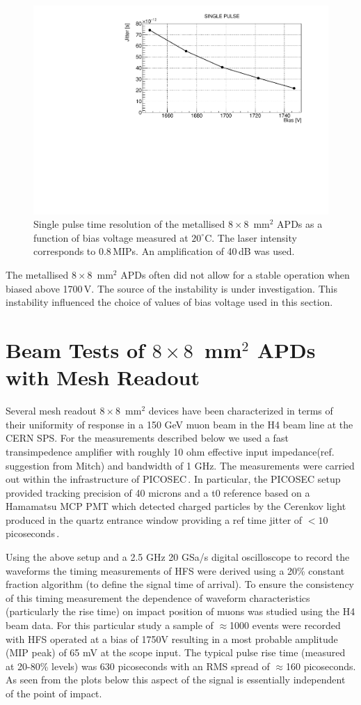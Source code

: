 \documentclass{article}
\begin{document}
\begin{figure}
  \centering
  \includegraphics[width = 0.6 \textwidth]{timeRes8x8metal}
  \caption{Single pulse time resolution of the metallised $8 \times 8$~mm$^2$ APDs as a function of bias voltage measured at $20^\circ$C. The laser intensity corresponds to 0.8\,MIPs. An amplification of 40\,dB was used.}
  \label{fig:timeRes8x8metal}
\end{figure}

The metallised $8 \times 8$~mm$^2$ APDs often did not allow for a stable operation when biased above 1700\,V.
The source of the instability is under investigation.
This instability influenced the choice of values of bias voltage used in this section.

\section{Beam Tests of $8 \times 8$~mm$^2$ APDs with Mesh Readout}
\label{sec:tb8x8}

Several mesh readout $8 \times 8$~mm$^2$ devices have been characterized in terms of their uniformity of response in a 150 GeV muon beam in the H4 beam line at the CERN SPS.
For the measurements described below we used a fast transimpedence amplifier with roughly 10 ohm effective input impedance(ref. suggestion from Mitch) and bandwidth of 1 GHz. The measurements were carried out within the infrastructure of PICOSEC\,\cite{bortfeld2018}.
In particular, the PICOSEC setup provided tracking precision of 40 microns and a t0 reference based on a Hamamatsu MCP PMT which detected charged particles by the Cerenkov light produced in the quartz entrance window providing a ref time jitter of $<10$ picoseconds\,\cite{sohl2018}.

Using the above setup and a 2.5 GHz 20 GSa/s digital oscilloscope to record the waveforms the timing measurements of HFS were derived using a 20\% constant fraction algorithm (to define the signal time of arrival).
To ensure the consistency of this timing measurement the dependence of waveform characteristics (particularly the rise time) on impact position of muons was studied using the H4 beam data.
For this particular study a sample of $\approx$1000 events were recorded with HFS operated at a bias of 1750V resulting in a most probable amplitude (MIP peak) of 65 mV at the scope input.
The typical pulse rise time (measured at 20-80\% levels) was 630 picoseconds with an RMS spread of $\approx$160 picoseconds.
As seen from the plots below this aspect of the signal is essentially independent of the point of impact.
\end{document}
